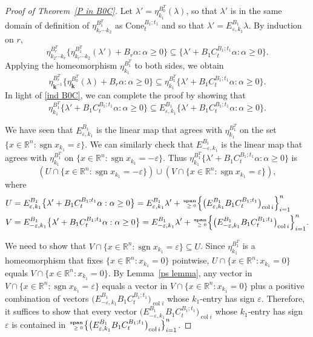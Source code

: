 \documentclass[10pt]{article}
\theoremstyle{definition}
\theoremstyle{remark}
\numberwithin{equation}{section}
\newcommand{\reals}{\mathbb R}
\newcommand{\ep}{\varepsilon}
\newcommand{\col}{\operatorname{col}}
\newcommand{\sgn}{\operatorname{sgn}}
\newcommand{\nnspan}{{\!\!\tiny\begin{array}{r}\mathbf{span}\\\ge0\end{array}\hspace*{-0.57em}}}
\newcommand{\set}[1]{{\lbrace #1 \rbrace}}
\newcommand{\sett}[1]{{\bigl\lbrace #1 \bigr\rbrace}}
\newcommand{\settt}[1]{{\Bigl\lbrace #1 \Bigr\rbrace}}
\newcommand{\0}{{\mathbf{0}}}
\newcommand{\Cone}{\mathrm{Cone}}
\newcommand{\kk}{{\boldsymbol{k}}}
\begin{document}
\begin{proof}[Proof of Theorem~\ref{P in B0C}]
Let $\lambda'=\eta_{k_1}^{B_0^T}(\lambda)$, so that $\lambda'$ is in the same domain of definition of $\eta_{k_r\cdots k_2}^{B_1^T}$ as $\Cone_t^{B_1;t_1}$ and so that $\lambda'=E^{B_1}_{\ep,k_1}\lambda$.
By induction on $r$, 
\[\eta_{k_2\cdots k_r}^{B_r^T}\set{\eta_{k_r\cdots k_2}^{B_1^T}(\lambda')+B_r\alpha:\alpha\ge0}\subseteq\set{\lambda'+B_1C_t^{B_1;t_1}\alpha:\alpha\ge0}.\]
Applying the homeomorphism $\eta_{k_1}^{B_1^T}$ to both sides, we obtain
\[\eta_{\kk^{-1}}^{B_r^T}\set{\eta_\kk^{B_0^T}(\lambda)+B_r\alpha:\alpha\ge0}\subseteq\eta_{k_1}^{B_1^T}\set{\lambda'+B_1C_t^{B_1;t_1}\alpha:\alpha\ge0}.\]
In light of \eqref{ind B0C}, we can complete the proof by showing that
\[\eta_{k_1}^{B_1^T}\sett{\lambda'+B_1C_t^{B_1;t_1}\alpha:\alpha\ge0}\subseteq E^{B_1}_{\ep,k_1}\sett{\lambda'+B_1C_t^{B_1;t_1}\alpha:\alpha\ge0}.\]

We have seen that $E^{B_1}_{\ep,k_1}$ is the linear map that agrees with $\eta_{k_1}^{B_1^T}$ on the set $\set{x\in\reals^n:\sgn x_{k_1}=\ep}$.
We can similarly check that $E^{B_1}_{-\ep,k_1}$ is the linear map that agrees with $\eta_{k_1}^{B_1^T}$ on $\set{x\in\reals^n:\sgn x_{k_1}=-\ep}$.
Thus $\eta_{k_1}^{B_1^T}\set{\lambda'+B_1C_t^{B_1;t_1}\alpha:\alpha\ge0}$ is
\[(U\cap\set{x\in\reals^n:\sgn x_{k_1}=-\ep})\cup(V\cap\set{x\in\reals^n:\sgn x_{k_1}=\ep}),\]
where %
{\small
\begin{align*}
U&=E^{B_1}_{\ep,k_1}\sett{\lambda'+B_1C_t^{B_1;t_1}\alpha:\alpha\ge0}=E^{B_1}_{\ep,k_1}\lambda'+\nnspan\settt{\bigl(E^{B_1}_{\ep,k_1}B_1C_t^{B_1;t_1}\bigr)_{\col i}}_{i=1}^n\\
V&=E^{B_1}_{-\ep,k_1}\sett{\lambda'+B_1C_t^{B_1;t_1}\alpha:\alpha\ge0}=E^{B_1}_{-\ep,k_1}\lambda'+\nnspan\settt{\bigl(E^{B_1}_{-\ep,k_1}B_1C_t^{B_1;t_1}\bigr)_{\col i}}_{i=1}^n.
\end{align*}
}

We need to show that $V\cap\set{x\in\reals^n:\sgn x_{k_1}=\ep}\subseteq U$.
Since $\eta_{k_1}^{B_1^T}$ is a homeomorphism that fixes $\set{x\in\reals^n:x_{k_1}=0}$ pointwise, $U\cap\set{x\in\reals^n:x_{k_1}=0}$ equals $V\cap\set{x\in\reals^n:x_{k_1}=0}$.
By Lemma~\ref{ps lemma}, any vector in $V\cap\set{x\in\reals^n:\sgn x_{k_1}=\ep}$ equals a vector in $V\cap\set{x\in\reals^n:x_{k_1}=0}$ plus a positive combination of vectors $\bigl(E^{B_1}_{-\ep,k_1}B_1C_t^{B_1;t_1}\bigr)_{\col i}$ whose $k_1$-entry has sign $\ep$.
Therefore, it suffices to show that every vector $\bigl(E^{B_1}_{-\ep,k_1}B_1C_t^{B_1;t_1}\bigr)_{\col i}$ whose $k_1$-entry has sign~$\ep$ is contained in $\nnspan\sett{\bigl(E^{B_1}_{\ep,k_1}B_1C_t^{B_1;t_1}\bigr)_{\col i}}_{i=1}^n$.


\end{proof}
\end{document}
